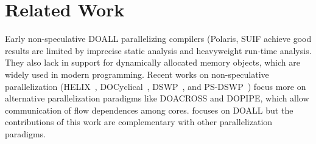 \section{Related Work}






Early non-speculative DOALL parallelizing compilers
(Polaris\cite{blume:94:polaris},
SUIF\cite{amarasinghe:93:pldi,suif:94:stanford} achieve good results are
limited by imprecise static analysis and heavyweight run-time analysis.
They also lack in support for dynamically allocated memory objects, which
are widely used in modern programming. Recent works on non-speculative
parallelization (HELIX~\cite{simone:12:cgo},
DOCyclical~\cite{yu2016cyclical}, DSWP~\cite{ottoni:05:micro}, and
PS-DSWP~\cite{raman:08a:cgo}) focus more on alternative parallelization
paradigms like DOACROSS and DOPIPE, which allow communication of flow
dependences among cores. \name focuses on DOALL but the contributions of
this work are complementary with other parallelization paradigms.

